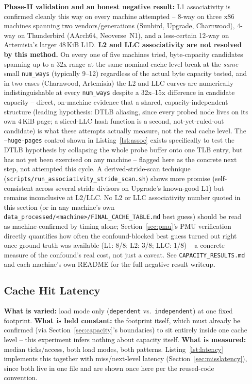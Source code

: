 \documentclass{article}
\begin{document}
\textbf{Phase-II validation and an honest negative result:} L1 associativity is confirmed
cleanly this way on every machine attempted -- 8-way on three x86 machines spanning two
vendors/generations (Sunbird, Upgrade, Charnwood), 4-way on Thunderbird (AArch64,
Neoverse~N1), and a less-certain 12-way on Artemisia's larger 48\,KiB L1D. \textbf{L2 and
LLC associativity are not resolved by this method.} On every one of five machines tried,
byte-capacity candidates spanning up to a 32x range at the same nominal cache level break
at the \emph{same} small \texttt{num\_ways} (typically 9--12) regardless of the actual
byte capacity tested, and in two cases (Charnwood, Artemisia) the L2 and LLC curves are
numerically indistinguishable at every \texttt{num\_ways} despite a 32x--15x difference in
candidate capacity -- direct, on-machine evidence that a shared, capacity-independent
structure (leading hypothesis: DTLB aliasing, since every probed node lives on its own
4\,KiB page; a sliced-LLC hash function is a second, not-yet-ruled-out candidate) is what
these attempts actually measure, not the real cache level. The \texttt{--huge-pages}
control shown in Listing~\ref{lst:assoc} exists specifically to test the DTLB hypothesis by
collapsing the whole probe buffer onto one TLB entry, but has not yet been exercised on any
machine -- flagged here as the concrete next step, not attempted this cycle. A
derived-stride-scan technique (\texttt{scripts/run\_associativity\_stride\_scan.sh}) shows
more promise (self-consistent across several stride divisors on Upgrade's known-good L1)
but remains inconclusive at L2/LLC. No L2 or LLC associativity number quoted in this
section (or in any machine's own \texttt{data\_processed/<machine>/FINAL\_CACHE\_TABLE.md}
best guess) should be read as machine-confirmed by timing alone; Section~\ref{sec:pmu}'s
PMU verification directly quantifies how often the confound-blocked best guess turned out
right once ground truth was available (L1: 8/8; L2: 3/8; LLC: 1/8) -- a concrete measure of
the confound's real cost, not just a caveat. See \texttt{CAPACITY\_RESULTS.md} and each
machine's own README for the full negative-result writeup.

\subsection{Cache Hit Latency}
\label{sec:hitlatency}

\textbf{What is varied:} load mode only (\texttt{dependent} vs.\ \texttt{independent}) at
one fixed footprint. \textbf{What is held constant:} the footprint itself, which must
already be confirmed (via Section~\ref{sec:capacity}'s boundaries) to sit entirely inside
one cache level -- this experiment infers nothing about capacity itself.
\textbf{What is measured:} median ticks/access, both load modes, both patterns.
Listing~\ref{lst:latency} implements this together with miss/next-level latency
(Section~\ref{sec:misslatency}), since both live in one file and are shown once here per
the reused-code convention.
\end{document}
